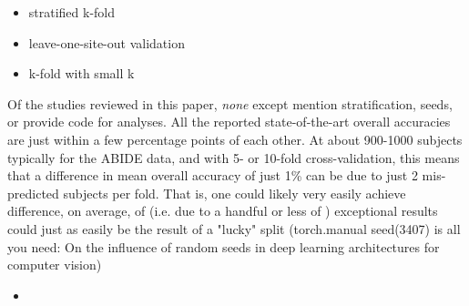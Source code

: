 \documentclass[10pt]{article}
\begin{document}
\begin{itemize}
  \item stratified k-fold
  \item leave-one-site-out validation \citep{ingalhalikarFunctionalConnectivitybasedPrediction2021}
  \item k-fold with small k
\end{itemize}

Of the studies reviewed in this paper, \emph{none} except
\citet{ingalhalikarFunctionalConnectivitybasedPrediction2021} mention stratification, seeds, or
provide code for analyses. All the reported state-of-the-art overall accuracies are just within a
few percentage points of each other. At about 900-1000 subjects typically for the ABIDE data, and
with 5- or 10-fold cross-validation, this means that a difference in mean overall accuracy of just
1\% can be due to just 2 mis-predicted subjects per fold. That is, one could likely very easily
achieve  difference, on average, of   (i.e. due to a handful or less of ) exceptional results could
just as easily be the result of a "lucky" split (torch.manual seed(3407) is all you need: On the
influence of random seeds in deep learning architectures for computer vision)

\begin{itemize}
  \item
\end{itemize}
\end{document}

